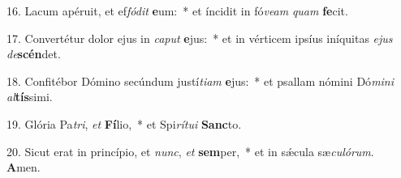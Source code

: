 16. Lacum apéruit, et ef\textit{fó}\textit{dit} \textbf{e}um:~*  et íncidit in fó\textit{ve}\textit{am} \textit{quam} \textbf{fe}cit.\

17. Convertétur dolor ejus in \textit{ca}\textit{put} \textbf{e}jus:~*  et in vérticem ipsíus iníquitas \textit{e}\textit{jus} \textit{de}\textbf{scén}det.\

18. Confitébor Dómino secúndum justí\textit{ti}\textit{am} \textbf{e}jus:~*  et psallam nómini Dó\textit{mi}\textit{ni} \textit{al}\textbf{tís}simi.\

19. Glória Pa\textit{tri}, \textit{et} \textbf{Fí}lio,~*  et Spi\textit{rí}\textit{tu}\textit{i} \textbf{Sanc}to.\

20. Sicut erat in princípio, et \textit{nunc}, \textit{et} \textbf{sem}per,~*  et in sǽcula sæ\textit{cu}\textit{ló}\textit{rum}. \textbf{A}men.\

